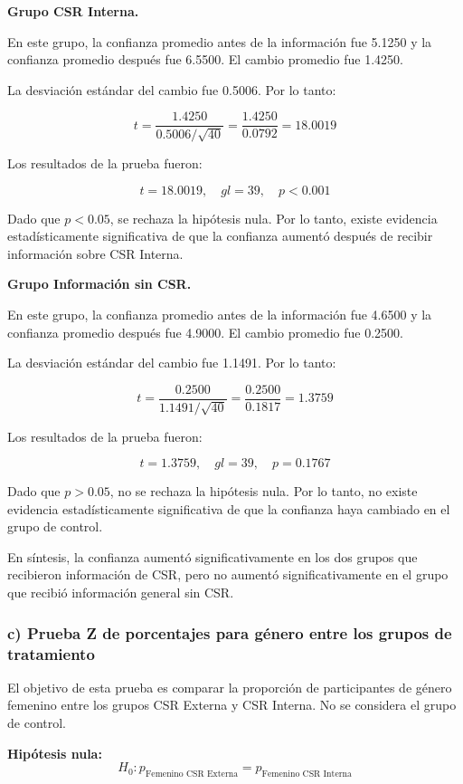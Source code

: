\documentclass[12pt,letterpaper]{article}
\begin{document}
\textbf{Grupo CSR Interna.}

En este grupo, la confianza promedio antes de la información fue 5.1250 y la confianza promedio después fue 6.5500. El cambio promedio fue 1.4250.

La desviación estándar del cambio fue 0.5006. Por lo tanto:

\[
t =
\frac{1.4250}
{0.5006/\sqrt{40}}
=
\frac{1.4250}{0.0792}
= 18.0019
\]

Los resultados de la prueba fueron:

\[
t = 18.0019,\quad gl = 39,\quad p < 0.001
\]

Dado que \(p < 0.05\), se rechaza la hipótesis nula. Por lo tanto, existe evidencia estadísticamente significativa de que la confianza aumentó después de recibir información sobre CSR Interna.

\textbf{Grupo Información sin CSR.}

En este grupo, la confianza promedio antes de la información fue 4.6500 y la confianza promedio después fue 4.9000. El cambio promedio fue 0.2500.

La desviación estándar del cambio fue 1.1491. Por lo tanto:

\[
t =
\frac{0.2500}
{1.1491/\sqrt{40}}
=
\frac{0.2500}{0.1817}
= 1.3759
\]

Los resultados de la prueba fueron:

\[
t = 1.3759,\quad gl = 39,\quad p = 0.1767
\]

Dado que \(p > 0.05\), no se rechaza la hipótesis nula. Por lo tanto, no existe evidencia estadísticamente significativa de que la confianza haya cambiado en el grupo de control.

En síntesis, la confianza aumentó significativamente en los dos grupos que recibieron información de CSR, pero no aumentó significativamente en el grupo que recibió información general sin CSR.

\subsubsection*{c) Prueba Z de porcentajes para género entre los grupos de tratamiento}

El objetivo de esta prueba es comparar la proporción de participantes de género femenino entre los grupos CSR Externa y CSR Interna. No se considera el grupo de control.

\textbf{Hipótesis nula:}
\[
H_0: p_{\text{Femenino CSR Externa}} = p_{\text{Femenino CSR Interna}}
\]
\end{document}
